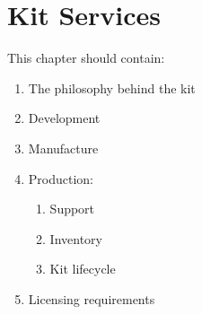 \chapter{Kit Services}

This chapter should contain:
\begin{enumerate}
\item The philosophy behind the kit
\item Development
\item Manufacture
\item Production:
  \begin{enumerate}
  \item Support
  \item Inventory
  \item Kit lifecycle
  \end{enumerate}
\item Licensing requirements
\end{enumerate}
